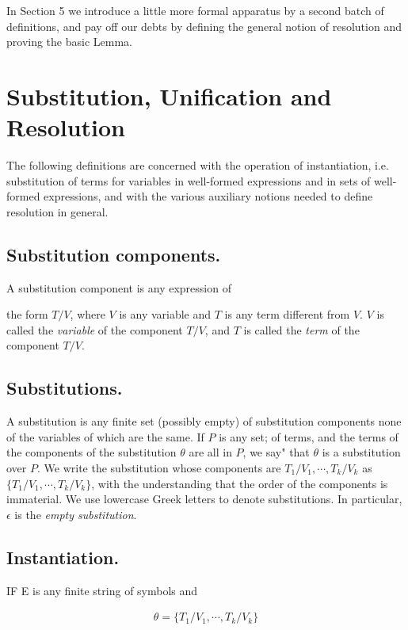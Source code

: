 \documentclass[8pt]{extarticle}
\begin{document}
In Section 5 we introduce a little more formal apparatus by a second batch of definitions, and pay off our debts by defining the general notion of resolution and proving the basic Lemma.

\section{Substitution, Unification and Resolution}

The following definitions are concerned with the operation of instantiation, i.e. substitution of terms for variables in well-formed expressions and in sets of well-formed expressions, and with the various auxiliary notions needed to define resolution in general.

\subsection{Substitution components.} A substitution component is any expression of
\newpage

\noindent the form $T/V$, where $V$ is any variable and $T$ is any term different from $V$. $V$ is
called the \emph{variable} of the component $T/V$, and $T$ is called the \emph{term} of the component $T/V$.

\subsection{Substitutions.}

A substitution is any finite set (possibly empty) of substitution components none of the variables of which are the same. If $P$ is any set;
of terms, and the terms of the components of the substitution $\theta$ are all in $P$, we say" that $\theta$ is a substitution over $P$. We write the substitution whose components are $T_1/V_1, \dotsm , T_k/V_k$ as $\{T_1/V_1, \dotsm, T_k/V_k\}$, with the understanding that the order of the components is immaterial. We use lowercase Greek letters to denote substitutions. In particular, $\epsilon$ is the \emph{empty substitution}.

\subsection{Instantiation.}

IF E is any finite string of symbols and

\begin{align*}
    \theta = \{T_1/V_1, \dotsm, T_k/V_k\}
\end{align*}
\end{document}
